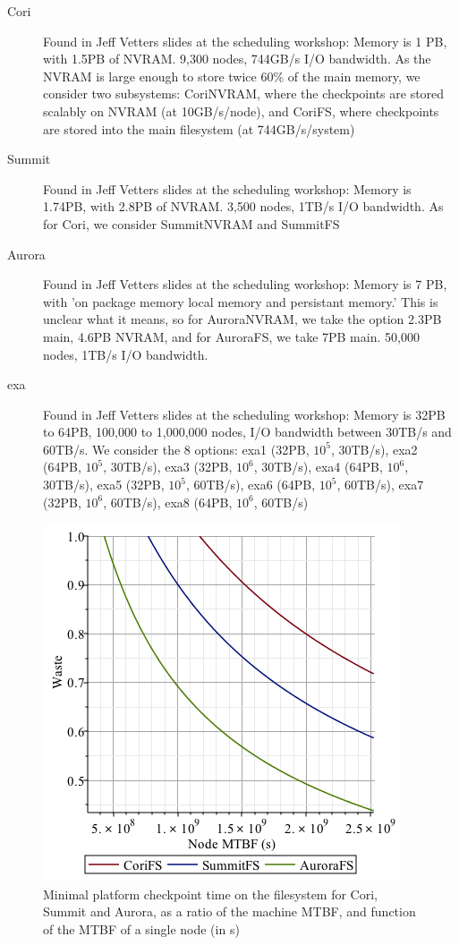\documentclass{article}
\begin{document}
\begin{description}
\item[Cori] Found in Jeff Vetters slides at the scheduling workshop: Memory is 1 PB, with 1.5PB of NVRAM. 9,300 nodes, 744GB/s I/O bandwidth. As the NVRAM is large enough to store twice 60\% of the main memory, we consider two subsystems: CoriNVRAM, where the checkpoints are stored scalably on NVRAM (at 10GB/s/node), and CoriFS, where checkpoints are stored into the main filesystem (at 744GB/s/system)
\item[Summit] Found in Jeff Vetters slides at the scheduling workshop: Memory is 1.74PB, with 2.8PB of NVRAM. 3,500 nodes, 1TB/s I/O bandwidth. As for Cori, we consider SummitNVRAM and SummitFS
\item[Aurora] Found in Jeff Vetters slides at the scheduling workshop: Memory is 7 PB, with 'on package memory local memory and persistant memory.' This is unclear what it means, so for AuroraNVRAM, we take the option 2.3PB main, 4.6PB NVRAM, and for AuroraFS, we take 7PB main. 50,000 nodes, 1TB/s I/O bandwidth.
\item[exa] Found in Jeff Vetters slides at the scheduling workshop: Memory is 32PB to 64PB, 100,000 to 1,000,000 nodes, I/O bandwidth between 30TB/s and 60TB/s. We consider the 8 options: exa1 (32PB, $10^5$, 30TB/s), exa2 (64PB, $10^5$, 30TB/s), exa3 (32PB, $10^6$, 30TB/s), exa4 (64PB, $10^6$, 30TB/s), exa5 (32PB, $10^5$, 60TB/s), exa6 (64PB, $10^5$, 60TB/s), exa7 (32PB, $10^6$, 60TB/s), exa8 (64PB, $10^6$, 60TB/s)
\end{description}

\begin{figure}[h!]
\begin{center}
  \includegraphics[width=.6\linewidth]{csa-fs.png}
\end{center}
\caption{Minimal platform checkpoint time on the filesystem for Cori, Summit and Aurora, as a ratio of the machine MTBF, and function of the MTBF of a single node (in s)\label{fig:csa-fs}}
\end{figure}
\end{document}
